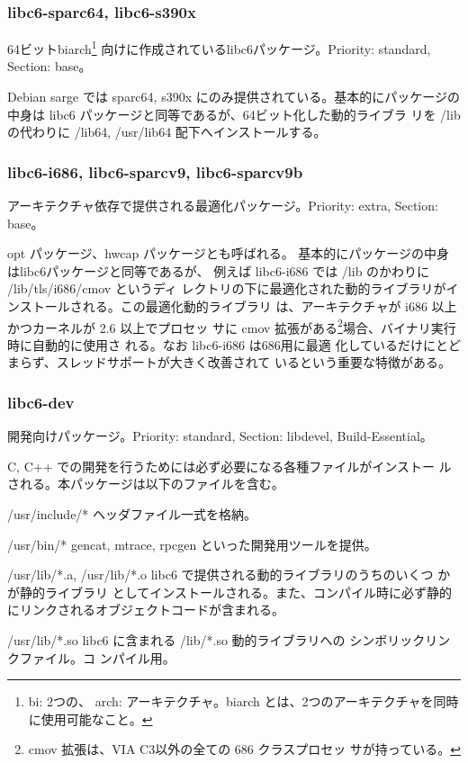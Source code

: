 \documentclass[mingoth]{jsarticle}
\newenvironment{gdescription}%
{%
   \begin{list}{}%
   {%
      \setlength{\itemindent}{0mm}
      \setlength{\leftmargin}{45mm}%
      \setlength{\rightmargin}{0zw}%
      \setlength{\labelsep}{4mm}%
      \setlength{\labelwidth}{4cm}%
      \setlength{\itemsep}{0em}%
      \setlength{\parsep}{0cm}%
      \setlength{\listparindent}{0cm}%
      \let\makelabel\gdescriptionlabel
   }
}{%
   \end{list}%
}
\newcommand*\gdescriptionlabel[1]{\hspace\labelsep\normalfont\bfseries #1}
\begin{document}
  \subsubsection{libc6-sparc64, libc6-s390x}

    64ビットbiarch\footnote{bi: 2つの、
    arch: アーキテクチャ。biarch とは、2つのアーキテクチャを同時に使用可能なこと。}
    向けに作成されているlibc6パッケージ。Priority: standard,
    Section: base。

    Debian sarge では
    sparc64, s390x にのみ提供されている。基本的にパッケージの中身は 
    libc6 パッケージと同等であるが、64ビット化した動的ライブラ
    リを /lib の代わりに /lib64, /usr/lib64 配下へインストールする。

  \subsubsection{libc6-i686, libc6-sparcv9, libc6-sparcv9b}

    アーキテクチャ依存で提供される最適化パッケージ。Priority: extra, Section: base。

    opt パッケージ、hwcap パッケージとも呼ばれる。
    基本的にパッケージの中身はlibc6パッケージと同等であるが、
    例えば libc6-i686 では /lib のかわりに /lib/tls/i686/cmov というディ
    レクトリの下に最適化された動的ライブラリがインストールされる。この最適化動的ライブラリ
    は、アーキテクチャが i686 以上かつカーネルが 2.6 以上でプロセッ
    サに cmov 拡張がある\footnote{cmov 拡張は、VIA C3以外の全ての 686 クラスプロセッ
    サが持っている。}場合、バイナリ実行時に自動的に使用さ
    れる。なお libc6-i686 は686用に最適
    化しているだけにとどまらず、スレッドサポートが大きく改善されて
    いるという重要な特徴がある。

  \subsubsection{libc6-dev}

    開発向けパッケージ。Priority: standard, Section: libdevel, Build-Essential。

    C, C++ での開発を行うためには必ず必要になる各種ファイルがインストー
    ルされる。本パッケージは以下のファイルを含む。

    \begin{gdescription}
      \item[/usr/include/*] ヘッダファイル一式を格納。
      \item[/usr/bin/*] gencat, mtrace, rpcgen といった開発用ツールを提供。
      \item[/usr/lib/*.a, /usr/lib/*.o] libc6 で提供される動的ライブラリのうちのいくつ
		 かが静的ライブラリ
		 としてインストールされる。また、コンパイル時に必ず静的
		 にリンクされるオブジェクトコードが含まれる。
      \item[/usr/lib/*.so] libc6 に含まれる /lib/*.so 動的ライブラリへの
		 シンボリックリンクファイル。コ
		 ンパイル用。
    \end{gdescription}
\end{document}
